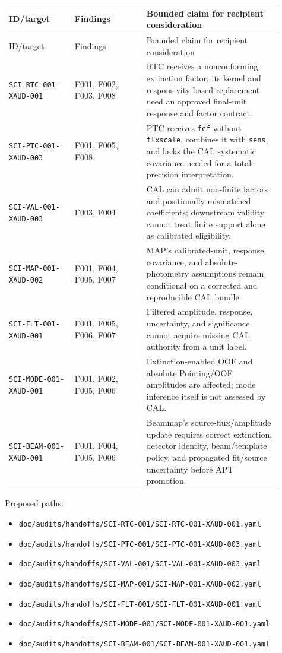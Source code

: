 \documentclass[11pt]{article}
\newcommand{\code}[1]{\nolinkurl{#1}}
\begin{document}
\begin{longtable}{L{0.22\linewidth}L{0.24\linewidth}L{0.45\linewidth}}
\toprule
ID/target & Findings & Bounded claim for recipient consideration\\
\midrule
\endfirsthead
\toprule
ID/target & Findings & Bounded claim for recipient consideration\\
\midrule
\endhead
\texttt{SCI-RTC-001-\allowbreak{}XAUD-001} & F001, F002, F003, F008 & RTC receives a
nonconforming extinction factor; its kernel and responsivity-based replacement
need an approved final-unit response and factor contract.\\
\texttt{SCI-PTC-001-\allowbreak{}XAUD-003} & F001, F005, F008 & PTC receives \code{fcf}
without \code{flxscale}, combines it with \code{sens}, and lacks the CAL
systematic covariance needed for a total-precision interpretation.\\
\texttt{SCI-VAL-001-\allowbreak{}XAUD-003} & F003, F004 & CAL can admit non-finite factors and
positionally mismatched coefficients; downstream validity cannot treat finite
support alone as calibrated eligibility.\\
\texttt{SCI-MAP-001-\allowbreak{}XAUD-002} & F001, F004, F005, F007 & MAP's calibrated-unit,
response, covariance, and absolute-photometry assumptions remain conditional
on a corrected and reproducible CAL bundle.\\
\texttt{SCI-FLT-001-\allowbreak{}XAUD-001} & F001, F005, F006, F007 & Filtered amplitude,
response, uncertainty, and significance cannot acquire missing CAL authority
from a unit label.\\
\texttt{SCI-MODE-001-\allowbreak{}XAUD-001} & F001, F002, F005, F006 & Extinction-enabled OOF
and absolute Pointing/OOF amplitudes are affected; mode inference itself is not
assessed by CAL.\\
\texttt{SCI-BEAM-001-\allowbreak{}XAUD-001} & F001, F004, F005, F006 & Beammap's
source-flux/amplitude update requires correct extinction, detector identity,
beam/template policy, and propagated fit/source uncertainty before APT
promotion.\\
\bottomrule
\end{longtable}

Proposed paths:
\begin{itemize}[leftmargin=*]
\item \code{doc/audits/handoffs/SCI-RTC-001/SCI-RTC-001-XAUD-001.yaml}
\item \code{doc/audits/handoffs/SCI-PTC-001/SCI-PTC-001-XAUD-003.yaml}
\item \code{doc/audits/handoffs/SCI-VAL-001/SCI-VAL-001-XAUD-003.yaml}
\item \code{doc/audits/handoffs/SCI-MAP-001/SCI-MAP-001-XAUD-002.yaml}
\item \code{doc/audits/handoffs/SCI-FLT-001/SCI-FLT-001-XAUD-001.yaml}
\item \code{doc/audits/handoffs/SCI-MODE-001/SCI-MODE-001-XAUD-001.yaml}
\item \code{doc/audits/handoffs/SCI-BEAM-001/SCI-BEAM-001-XAUD-001.yaml}
\end{itemize}
\end{document}
